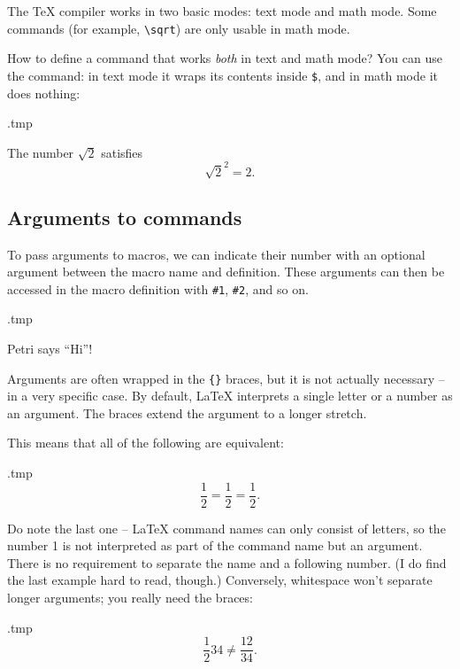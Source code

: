 The \TeX{} compiler works in two basic modes: text mode and math mode.
Some commands (for example, \verb|\sqrt|) are only usable in math mode.

How to define a command that works \emph{both} in text and math mode?
You can use the  command: in text mode it wraps its contents inside \verb|$|,
and in math mode it does nothing:
%
\begin{VerbatimOut}{\jobname.tmp}
\newcommand{\magic}{\ensuremath{\sqrt 2}}

The number \magic{} satisfies
\[
\magic^2 = 2.
\]
\end{VerbatimOut}
\ShowExample




%
\subsection{Arguments to commands}

To pass arguments to macros, we can indicate their number with an optional argument
between the macro name and definition.
These arguments can then be accessed in the macro definition with \verb|#1|, \verb|#2|, and so on.

\begin{VerbatimOut}{\jobname.tmp}
\newcommand{\say}[2]{#1 says ``#2''!}

\say{Petri}{Hi}
\end{VerbatimOut}
\ShowExample

Arguments are often wrapped in the \verb|{}| braces,
but it is not actually necessary -- in a very specific case.
By default, \LaTeX{} interprets a single letter or a number as an argument.
The braces extend the argument to a longer stretch.

This means that all of the following are equivalent:

\begin{VerbatimOut}{\jobname.tmp}
\[
\frac{1}{2}
= \frac 1 2
= \frac12.
\]
\end{VerbatimOut}
\ShowExample

Do note the last one -- \LaTeX{} command names can only consist of letters,
so the number 1 is not interpreted as part of the command name but an argument.
There is no requirement to separate the name and a following number.
(I do find the last example hard to read, though.)
Conversely, whitespace won't separate longer arguments; you really need the braces:

\begin{VerbatimOut}{\jobname.tmp}
\[
\frac 12 34
\neq \frac {12} {34}.
\]
\end{VerbatimOut}
\ShowExample


